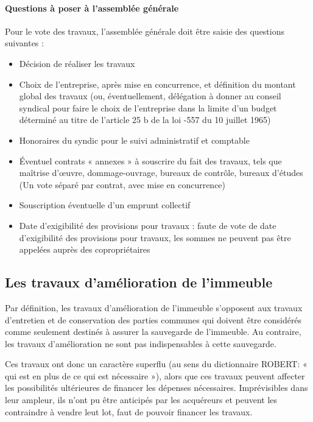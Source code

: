 			\paragraph{Questions à poser à l’assemblée générale}
			
				Pour le vote des travaux, l’assemblée générale doit être saisie des questions suivantes :
				\begin{itemize}
					\item Décision de réaliser les travaux
					\item Choix de l’entreprise, après mise en concurrence, et définition du montant global des travaux (ou, éventuellement, délégation à donner au conseil syndical pour faire le choix de l’entreprise dans la limite d’un budget déterminé au titre de l’article 25 b de la loi -557 du 10 juillet 1965)
					\item Honoraires du syndic pour le suivi administratif et comptable
					\item Éventuel contrats « annexes » à souscrire du fait des travaux, tels que maîtrise d’œuvre, dommage-ouvrage, bureaux de contrôle, bureaux d’études \etc (Un vote séparé par contrat, avec mise en concurrence)
					\item Souscription éventuelle d’un emprunt collectif
					\item Date d’exigibilité des provisions pour travaux : faute de vote de date d’exigibilité des provisions pour travaux, les sommes ne peuvent pas être appelées auprès des copropriétaires
				\end{itemize}
		
	\subsection{Les travaux d’amélioration de l’immeuble}
	
		Par définition, les travaux d'amélioration de l'immeuble s'opposent aux travaux d'entretien et de conservation des parties communes qui doivent être considérés comme seulement destinés à assurer la sauvegarde de l'immeuble. Au contraire, les travaux d'amélioration ne sont pas indispensables à cette sauvegarde.
		
		Ces travaux ont donc un caractère superflu (au sens du dictionnaire ROBERT: « qui est en plus de ce qui est nécessaire »), alors que ces travaux peuvent affecter les possibilités ultérieures de financer les dépenses nécessaires. Imprévisibles dans leur ampleur, ils n’ont pu être anticipés par les acquéreurs et peuvent les contraindre à vendre leut lot, faut de pouvoir financer les travaux.
		
